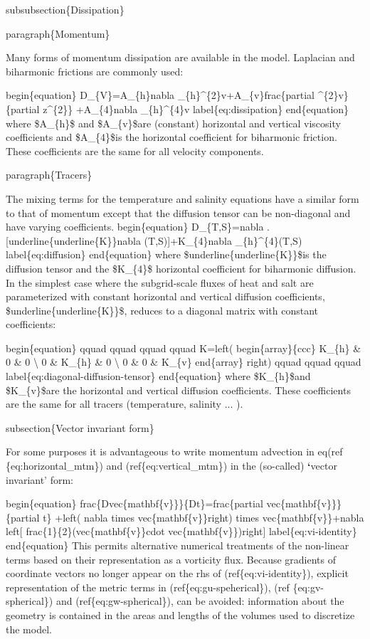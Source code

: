 \documentclass[letterpaper,10pt,english]{sphinxmanual}
\begin{document}
subsubsection\{Dissipation\}

paragraph\{Momentum\}

Many forms of momentum dissipation are available in the model. Laplacian and
biharmonic frictions are commonly used:

begin\{equation\}
D\_\{V\}=A\_\{h\}nabla \_\{h\}\textasciicircum{}\{2\}v+A\_\{v\}frac\{partial \textasciicircum{}\{2\}v\}\{partial z\textasciicircum{}\{2\}\}
+A\_\{4\}nabla \_\{h\}\textasciicircum{}\{4\}v  label\{eq:dissipation\}
end\{equation\}
where \$A\_\{h\}\$ and \$A\_\{v\}\$are (constant) horizontal and vertical viscosity
coefficients and \$A\_\{4\}\$is the horizontal coefficient for biharmonic
friction. These coefficients are the same for all velocity components.

paragraph\{Tracers\}

The mixing terms for the temperature and salinity equations have a similar
form to that of momentum except that the diffusion tensor can be
non-diagonal and have varying coefficients.
begin\{equation\}
D\_\{T,S\}=nabla .{[}underline\{underline\{K\}\}nabla (T,S){]}+K\_\{4\}nabla
\_\{h\}\textasciicircum{}\{4\}(T,S)  label\{eq:diffusion\}
end\{equation\}
where \$underline\{underline\{K\}\}\$is the diffusion tensor and the \$K\_\{4\}\$
horizontal coefficient for biharmonic diffusion. In the simplest case where
the subgrid-scale fluxes of heat and salt are parameterized with constant
horizontal and vertical diffusion coefficients, \$underline\{underline\{K\}\}\$,
reduces to a diagonal matrix with constant coefficients:

begin\{equation\}
qquad qquad qquad qquad K=left(
begin\{array\}\{ccc\}
K\_\{h\} \& 0 \& 0 \textbackslash{}
0 \& K\_\{h\} \& 0 \textbackslash{}
0 \& 0 \& K\_\{v\}
end\{array\}
right) qquad qquad qquad  label\{eq:diagonal-diffusion-tensor\}
end\{equation\}
where \$K\_\{h\}\$and \$K\_\{v\}\$are the horizontal and vertical diffusion
coefficients. These coefficients are the same for all tracers (temperature,
salinity ... ).

subsection\{Vector invariant form\}

For some purposes it is advantageous to write momentum advection in
eq(ref \{eq:horizontal\_mtm\}) and (ref\{eq:vertical\_mtm\}) in the
(so-called) {\color{red}\bfseries{}{}`}vector invariant' form:

begin\{equation\}
frac\{Dvec\{mathbf\{v\}\}\}\{Dt\}=frac\{partial vec\{mathbf\{v\}\}\}\{partial t\}
+left( nabla times vec\{mathbf\{v\}\}right) times vec\{mathbf\{v\}\}+nabla
left{[} frac\{1\}\{2\}(vec\{mathbf\{v\}\}cdot vec\{mathbf\{v\}\})right{]}
label\{eq:vi-identity\}
end\{equation\}
This permits alternative numerical treatments of the non-linear terms based
on their representation as a vorticity flux. Because gradients of coordinate
vectors no longer appear on the rhs of (ref\{eq:vi-identity\}), explicit
representation of the metric terms in (ref\{eq:gu-speherical\}), (ref
\{eq:gv-spherical\}) and (ref\{eq:gw-spherical\}), can be avoided: information
about the geometry is contained in the areas and lengths of the volumes used
to discretize the model.
\end{document}
